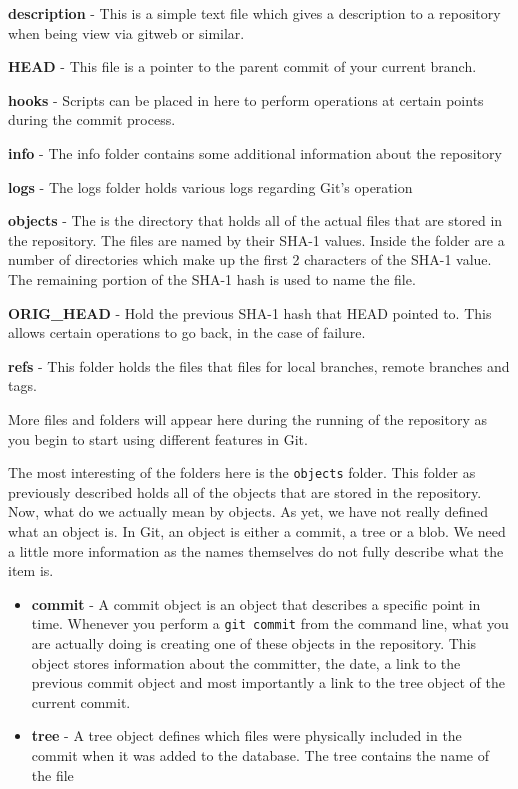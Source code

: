 \textbf{description} - This is a simple text file which gives a description to a repository when being view via gitweb or similar.

\textbf{HEAD} - This file is a pointer to the parent commit of your current branch.

\textbf{hooks} - Scripts can be placed in here to perform operations at certain points during the commit process.

\textbf{info} - The info folder contains some additional information about the repository

\textbf{logs} - The logs folder holds various logs regarding Git's operation

\textbf{objects} - The is the directory that holds all of the actual files that are stored in the repository.  The files are named by their SHA-1 values.  Inside the folder are a number of directories which make up the first 2 characters of the SHA-1 value.  The remaining portion of the SHA-1 hash is used to name the file.

\textbf{ORIG\_HEAD} - Hold the previous SHA-1 hash that HEAD pointed to.  This allows certain operations to go back, in the case of failure.

\textbf{refs} - This folder holds the files that files for local branches, remote branches and tags.

More files and folders will appear here during the running of the repository as you begin to start using different features in Git.

The most interesting of the folders here is the \texttt{objects} folder.  This folder as previously described holds all of the objects that are stored in the repository.  Now, what do we actually mean by objects.  As yet, we have not really defined what an object is.  In Git, an object is either a commit, a tree or a blob.  We need a little more information as the names themselves do not fully describe what the item is.

\begin{itemize}
\item\textbf{commit} - A commit object is an object that describes a specific point in time.  Whenever you perform a \texttt{git commit} from the command line, what you are actually doing is creating one of these objects in the repository.  This object stores information about the committer, the date, a link to the previous commit object and most importantly a link to the tree object of the current commit.
\item\textbf{tree} - A tree object defines which files were physically included in the commit when it was added to the database.  The tree contains the name of the file
\end{itemize}
